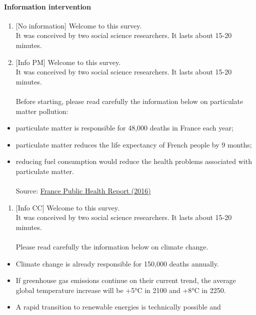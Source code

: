 \documentclass[12pt]{article} %
\begin{document}
\begin{appendices}
\paragraph{Information intervention}
\begin{enumerate}[leftmargin=*]
\item {[}No information{]} Welcome to this survey. \\
It was conceived by two social science researchers. It lasts about
15-20 minutes.
\item {[}Info PM{]} Welcome to this survey. \\
It was conceived by two social science researchers. It lasts about
15-20 minutes.\\
\\
Before starting, please read carefully the information below on particulate
matter pollution: 
\end{enumerate}
\begin{itemize}
\item particulate matter is responsible for 48,000 deaths in France each
year; 
\item particulate matter reduces the life expectancy of French people by
9 months; 
\item reducing fuel consumption would reduce the health problems associated
with particulate matter. \\
\\
Source: \href{https://www.santepubliquefrance.fr/content/download/189662/2330878}{France Public Health Report (2016)}
\end{itemize}
\begin{enumerate}[resume,leftmargin=*]
\item {[}Info CC{]} Welcome to this survey. \\
It was conceived by two social science researchers. It lasts about
15-20 minutes.\\
\\
Please read carefully the information below on climate change. \\
\end{enumerate}
\begin{itemize}
\item Climate change is already responsible for 150,000 deaths annually.
\item If greenhouse gas emissions continue on their current trend, the average
global temperature increase will be +5°C in 2100 and +8°C in 2250. 
\item A rapid transition to renewable energies is technically possible and

\end{itemize}
\end{appendices}
\end{document}
